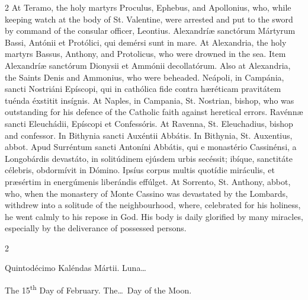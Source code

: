 \begin{paracol}{2}
\switchcolumn
{}
At Teramo, the holy martyrs Proculus, Ephebus, and Apollonius, who, while 
 keeping watch at the body of St. Valentine, were arrested and put to the 
 sword by command of the consular officer, Leontius.
\switchcolumn*
{}
Alexandríæ sanctórum Mártyrum Bassi, Antónii et 
 Protólici, qui demérsi sunt in mare.
\switchcolumn
{}
At Alexandria, the holy martyrs Bassus, Anthony, and Protolicus, who were 
 drowned in the sea.
\switchcolumn*
{}
Item Alexandríæ sanctórum Dionysii et Ammónii 
 decollatórum.
\switchcolumn
{}
Also at Alexandria, the Saints Denis and Ammonius, who were beheaded.
\switchcolumn*
{}
Neápoli, in Campánia, sancti Nostriáni Epíscopi, qui in cathólica fide 
 contra hæréticam pravitátem tuénda éxstitit 
 insígnis.
\switchcolumn
{}
At Naples, in Campania, St. Nostrian, bishop, who was outstanding for his 
 defence of the Catholic faith against heretical errors.
\switchcolumn*
{}
Ravénnæ sancti Eleuchádii, Epíscopi et 
 Confessóris.
\switchcolumn
{}
At Ravenna, St. Eleuchadius, bishop and confessor.
\switchcolumn*
{}
In Bithynia sancti Auxéntii Abbátis.
\switchcolumn
{}
In Bithynia, St. Auxentius, abbot.
\switchcolumn*
{}
Apud Surréntum sancti Antoníni Abbátis, qui e monastério Cassinénsi, a 
 Longobárdis devastáto, in solitúdinem ejúsdem urbis secéssit; ibíque, 
 sanctitáte célebris, obdormívit in Dómino. Ipsíus corpus multis 
 quotídie miráculis, et præsértim in energúmenis 
 liberándis effúlget.
\switchcolumn
{}
At Sorrento, St. Anthony, abbot, who, when the monastery of Monte Cassino 
 was devastated by the Lombards, withdrew into a solitude of the 
 neighbourhood, where, celebrated for his holiness, he went calmly to his 
 repose in God. His body is daily glorified by many miracles, 
 especially by the deliverance of possessed persons.
\switchcolumn*
{}
\end{paracol}


\begin{paracol}{2}
\begin{center}{\color{gregoriocolor} Quintodécimo Kaléndas Mártii. 
 Luna\dots\ }\end{center}
\switchcolumn
{}
\begin{center}{\color{gregoriocolor} The 15\textsuperscript{th} Day of 
 February. The\dots\ Day of the Moon.}\end{center}
\end{paracol}

